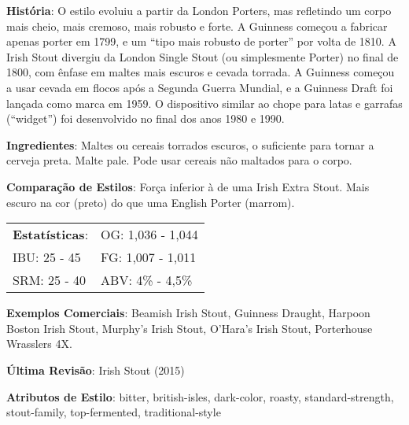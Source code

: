 \textbf{História}: O estilo evoluiu a partir da London Porters, mas refletindo um corpo mais cheio, mais cremoso, mais robusto e forte. A Guinness começou a fabricar apenas porter em 1799, e um “tipo mais robusto de porter” por volta de 1810. A Irish Stout divergiu da London Single Stout (ou simplesmente Porter) no final de 1800, com ênfase em maltes mais escuros e cevada torrada. A Guinness começou a usar cevada em flocos após a Segunda Guerra Mundial, e a Guinness Draft foi lançada como marca em 1959. O dispositivo similar ao chope para latas e garrafas (“widget”) foi desenvolvido no final dos anos 1980 e 1990.

\textbf{Ingredientes}: Maltes ou cereais torrados escuros, o suficiente para tornar a cerveja preta. Malte pale. Pode usar cereais não maltados para o corpo.

\textbf{Comparação de Estilos}: Força inferior à de uma Irish Extra Stout. Mais escuro na cor (preto) do que uma English Porter (marrom).

\begin{tabular}{@{}p{35mm}p{35mm}@{}}
  \textbf{Estatísticas}: & OG: 1,036 - 1,044 \\
  IBU: 25 - 45  & FG: 1,007 - 1,011 \\
  SRM: 25 - 40  & ABV: 4\% - 4,5\%
\end{tabular}

\textbf{Exemplos Comerciais}: Beamish Irish Stout, Guinness Draught, Harpoon Boston Irish Stout, Murphy's Irish Stout, O'Hara's Irish Stout, Porterhouse Wrasslers 4X.

\textbf{Última Revisão}: Irish Stout (2015)

\textbf{Atributos de Estilo}: bitter, british-isles, dark-color, roasty, standard-strength, stout-family, top-fermented, traditional-style